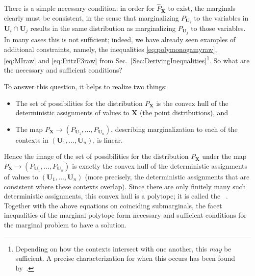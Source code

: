 {There is a simple necessary condition: in order for $\hat{P}_{\bm{X}}$ to exist, the marginals clearly must be consistent, in the sense that marginalizing $P_{\bm{U}_i}$ to the variables in $\bm{U}_i\cap\bm{U}_j$ results in the same distribution as marginalizing $P_{\bm{U}_j}$ to those variables.  
 In many cases this is not sufficient; indeed, we have already seen examples of additional constraints, namely, the inequalities \eqref{eq:polymonogamyraw}, \eqref{eq:MIraw} and \eqref{eq:FritzF3raw} from Sec.~\ref{Sec:DerivingInequalities}\footnote{Depending on how the contexts intersect with one another, this \emph{may} be sufficient. A precise characterization for when this occurs has been found by~\citet{vorobev_extension_1960}.}. So what are the necessary and sufficient conditions?

To answer this question, it helps to realize two things:
\begin{itemize}
	\item The set of possibilities for the distribution $P_{\bm{X}}$ is the convex hull of the deterministic assignments of values to $\bm{X}$ (the point distributions), and 
	\item The map $P_{\bm{X}}\to (P_{\bm{U}_1},\ldots,P_{\bm{U}_n})$, describing marginalization to each of the contexts in $(\bm{U}_1,\ldots,\bm{U}_n)$, is linear.
\end{itemize}
Hence the image of the set of possibilities for the distribution $P_{\bm{X}}$ under the map $P_{\bm{X}}\to (P_{\bm{U}_1},\ldots,P_{\bm{U}_n})$ is exactly the convex hull of the deterministic assignments of values to $(\bm{U}_1,\ldots,\bm{U}_n)$ (more precisely, the deterministic assignments that are consistent where these contexts overlap). Since there are only finitely many such deterministic assignments, this convex hull is a polytope; it is called the ~\cite{kahle_marginal_2010}. Together with the above equations on coinciding submarginals, the facet inequalities of the marginal polytope form necessary and sufficient conditions for the marginal problem to have a solution.



}
